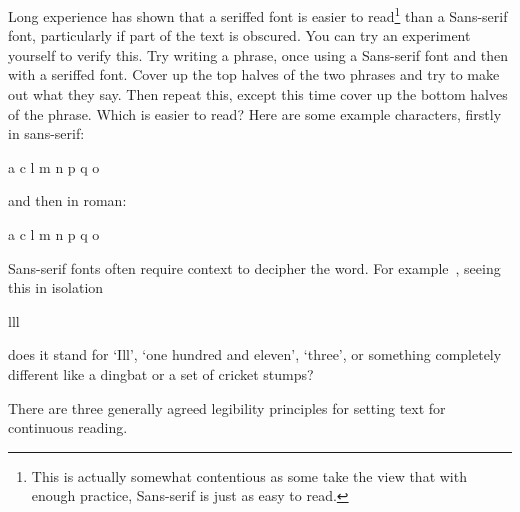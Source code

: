 \documentclass[10pt,letterpaper,extrafontsizes]{memoir}
\begin{document}
Long experience has shown that a seriffed font is easier to 
read\footnote{This is actually somewhat contentious as some take the view
that with enough practice, Sans-serif is just as easy to read.}
than a
Sans-serif font, particularly if part of the text is obscured. You can
try an experiment yourself to verify this. Try writing a phrase, once
using a Sans-serif font and then with a seriffed font. Cover up
the top halves of the two phrases and try to make out what they say. Then
repeat this, except this time cover up the bottom halves of the phrase.
Which is easier to read? Here are some example characters, firstly in sans-serif:
\begin{center}
{\Huge\sffamily a c l m n p q o}
\end{center}
and then in roman:
\begin{center}
{\Huge a c l m n p q o}
\end{center}

    Sans-serif fonts often require context to decipher the word. 
For example~\autocite{MCLEAN80},
seeing this in isolation
\begin{center}
{\Huge\sffamily lll}
\end{center}
does it stand for `Ill', `one hundred and eleven', `three', or something
completely different like a dingbat or a set of cricket stumps?

    
    There are three generally agreed legibility 
principles for setting text for
continuous reading.
\end{document}

